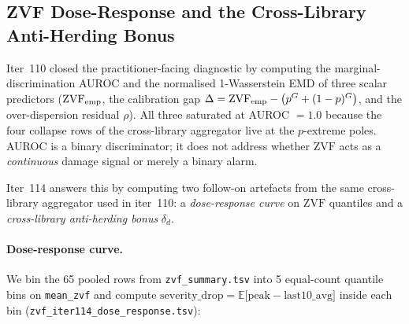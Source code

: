 
\subsection{ZVF Dose-Response and the Cross-Library Anti-Herding Bonus}
\label{sec:zvf-dose-response}

Iter~110 closed the practitioner-facing diagnostic by computing the
marginal-discrimination AUROC and the normalised 1-Wasserstein EMD of
three scalar predictors (\(\mathrm{ZVF}_{\rm emp}\), the calibration gap
\(\Delta = \mathrm{ZVF}_{\rm emp} - \bigl(p^{G}+(1-p)^{G}\bigr)\), and the
over-dispersion residual \(\rho\)). All three saturated at AUROC
\(=1.0\) because the four collapse rows of the cross-library
aggregator live at the \(p\)-extreme poles. AUROC is a binary
discriminator; it does not address whether \(\mathrm{ZVF}\) acts as a
\emph{continuous} damage signal or merely a binary alarm.

Iter~114 answers this by computing two follow-on artefacts from the
same cross-library aggregator used in iter~110: a
\emph{dose-response curve} on \(\mathrm{ZVF}\) quantiles and a
\emph{cross-library anti-herding bonus} \(\delta_{d}\).

\paragraph{Dose-response curve.}
We bin the 65 pooled rows from \texttt{zvf\_summary.tsv} into 5
equal-count quantile bins on \texttt{mean\_zvf} and compute
\(\mathrm{severity\_drop} = \mathbb{E}\bigl[\mathrm{peak} - \mathrm{last10\_avg}\bigr]\)
inside each bin
(\texttt{zvf\_iter114\_dose\_response.tsv}):

